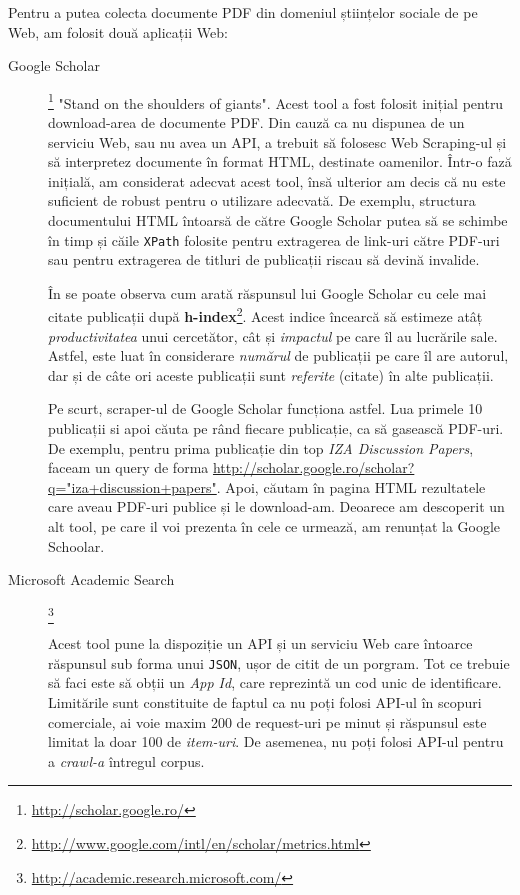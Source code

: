 Pentru a putea colecta documente PDF din domeniul științelor sociale de pe Web, am folosit două aplicații Web:
\begin{description}
\item[ Google Scholar]\footnote{\url{http://scholar.google.ro/}} "Stand on the shoulders of giants". Acest tool a fost folosit inițial pentru download-area de documente PDF. Din cauză ca nu dispunea de un serviciu Web, sau nu avea un API, a trebuit să folosesc Web Scraping-ul și să interpretez documente în format HTML, destinate oamenilor. Într-o fază inițială, am considerat adecvat acest tool, însă ulterior am decis că nu este suficient de robust pentru o utilizare adecvată. De exemplu, structura documentului HTML întoarsă de către Google Scholar putea să se schimbe în timp și căile \texttt{XPath} folosite pentru extragerea de link-uri către PDF-uri sau pentru extragerea de titluri de publicații riscau să devină invalide.


În  se poate observa cum arată răspunsul lui Google Scholar cu cele mai citate publicații după \textbf{h-index}\footnote{\url{http://www.google.com/intl/en/scholar/metrics.html}}. Acest indice încearcă să estimeze atâț \textit{productivitatea} unui cercetător, cât și \textit{impactul} pe care îl au lucrările sale. Astfel, este luat în considerare \textit{numărul} de publicații pe care îl are autorul, dar și de câte ori aceste publicații sunt \textit{referite} (citate) în alte publicații.


Pe scurt, scraper-ul de Google Scholar funcționa astfel. Lua primele 10 publicații si apoi căuta pe rând fiecare publicație, ca să gasească PDF-uri. De exemplu, pentru prima publicație din top \textit{IZA Discussion Papers}, faceam un query de forma \url{http://scholar.google.ro/scholar?q="iza+discussion+papers"}. Apoi, căutam în pagina HTML rezultatele care aveau PDF-uri publice și le download-am. Deoarece am descoperit un alt tool, pe care il voi prezenta în cele ce urmează, am renunțat la Google Schoolar.


\item [Microsoft Academic Search]\footnote{\url{http://academic.research.microsoft.com/}}

Acest tool pune la dispoziție un API și un serviciu Web care întoarce răspunsul sub forma unui \texttt{JSON}, ușor de citit de un porgram. Tot ce trebuie să faci este să obții un \textit{App Id}, care reprezintă un cod unic de identificare. Limitările sunt constituite de faptul ca nu poți folosi API-ul în scopuri comerciale, ai voie maxim 200 de request-uri pe minut și răspunsul este limitat la doar 100 de \textit{item-uri}. De asemenea, nu poți folosi API-ul pentru a \textit{crawl-a} întregul corpus.



\end{description}

